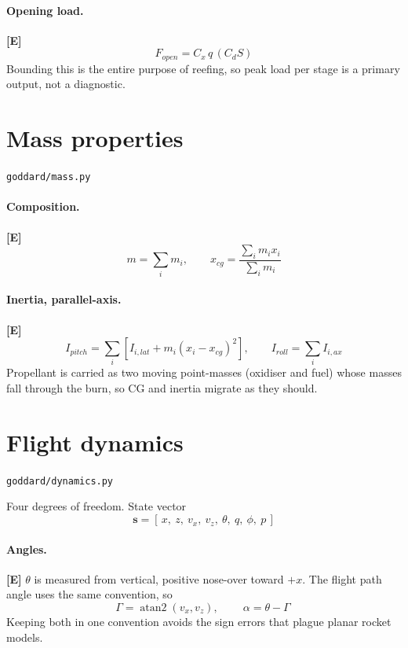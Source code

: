\documentclass[11pt,a4paper]{article}
\newcommand{\established}{\textcolor{okgreen}{\textbf{[E]}}\xspace}
\newcommand{\src}[1]{\hfill{\footnotesize\texttt{#1}}}
\begin{document}
\paragraph{Opening load.} \established
\begin{equation}
\boxed{\ F_{open} = C_x\, q\, (C_dS)\ }
\end{equation}
Bounding this is the entire purpose of reefing, so peak load per stage is a
primary output, not a diagnostic.

\section{Mass properties}
\src{goddard/mass.py}

\paragraph{Composition.} \established
\begin{equation}
m = \sum_i m_i, \qquad
x_{cg} = \frac{\sum_i m_i x_i}{\sum_i m_i}
\end{equation}

\paragraph{Inertia, parallel-axis.} \established
\begin{equation}
I_{pitch} = \sum_i \left[I_{i,lat} + m_i (x_i - x_{cg})^2\right],
\qquad
I_{roll} = \sum_i I_{i,ax}
\end{equation}
Propellant is carried as two moving point-masses (oxidiser and fuel) whose
masses fall through the burn, so CG and inertia migrate as they should.

\section{Flight dynamics}
\src{goddard/dynamics.py}

Four degrees of freedom. State vector
\begin{equation}
\mathbf{s} = [\,x,\ z,\ v_x,\ v_z,\ \theta,\ q,\ \phi,\ p\,]
\end{equation}

\paragraph{Angles.} \established
$\theta$ is measured from vertical, positive nose-over toward $+x$. The flight
path angle uses the same convention, so
\begin{equation}
\Gamma = \operatorname{atan2}(v_x, v_z), \qquad
\boxed{\ \alpha = \theta - \Gamma\ }
\end{equation}
Keeping both in one convention avoids the sign errors that plague planar rocket
models.
\end{document}
